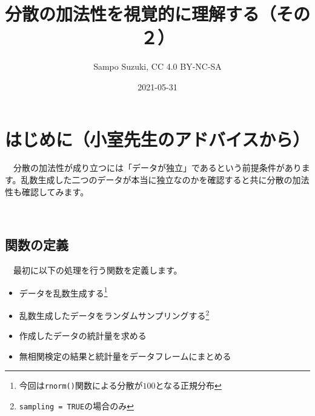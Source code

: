 \documentclass[]{tufte-handout}
\title[分散の加法性を視覚的に理解する（その２）]{分散の加法性を視覚的に理解する（その２）}
\author{Sampo Suzuki, CC 4.0 BY-NC-SA}
\date{2021-05-31}
\providecommand{\tightlist}{%
  \setlength{\itemsep}{0pt}\setlength{\parskip}{0pt}}
\begin{document}
\maketitle




\hypertarget{ux306fux3058ux3081ux306bux5c0fux5ba4ux5148ux751fux306eux30a2ux30c9ux30d0ux30a4ux30b9ux304bux3089}{%
\section{\texorpdfstring{\textbf{はじめに}（小室先生のアドバイスから）}{はじめに（小室先生のアドバイスから）}}\label{ux306fux3058ux3081ux306bux5c0fux5ba4ux5148ux751fux306eux30a2ux30c9ux30d0ux30a4ux30b9ux304bux3089}}

　分散の加法性が成り立つには「データが独立」であるという前提条件があります。乱数生成した二つのデータが本当に独立なのかを確認すると共に分散の加法性も確認してみます。

　

\hypertarget{ux95a2ux6570ux306eux5b9aux7fa9}{%
\subsection{\texorpdfstring{\textbf{関数の定義}}{関数の定義}}\label{ux95a2ux6570ux306eux5b9aux7fa9}}

　最初に以下の処理を行う関数を定義します。

\begin{itemize}
\tightlist
\item
  データを乱数生成する\footnote{今回は\texttt{rnorm()}関数による分散が\(100\)となる正規分布}
\item
  乱数生成したデータをランダムサンプリングする\footnote{\texttt{sampling\ =\ TRUE}の場合のみ}
\item
  作成したデータの統計量を求める
\item
  無相関検定の結果と統計量をデータフレームにまとめる
\end{itemize}
\end{document}

